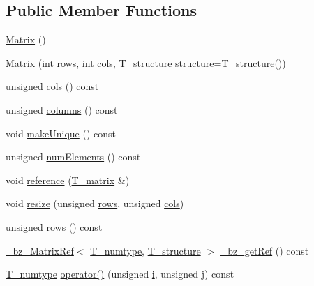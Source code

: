 \subsection*{Public Member Functions}
\begin{DoxyCompactItemize}
\item 
\hyperlink{classMatrix_af681cd26c7a0d3a102e309198be1c8c8}{Matrix} ()
\item 
\hyperlink{classMatrix_a6a7f5ed5100e108331ece885dc641dd5}{Matrix} (int \hyperlink{classMatrix_ac042ab4f91be304a8c7a6b9c3505157f}{rows}, int \hyperlink{classMatrix_a7a780e46272c5270b6e3d5dcb4c70e4b}{cols}, \hyperlink{classMatrix_a0441c5aed57ace2b56e48fc618b081bf}{T\+\_\+structure} structure=\hyperlink{classMatrix_a0441c5aed57ace2b56e48fc618b081bf}{T\+\_\+structure}())
\item 
unsigned \hyperlink{classMatrix_a7a780e46272c5270b6e3d5dcb4c70e4b}{cols} () const 
\item 
unsigned \hyperlink{classMatrix_a7943fa99256bcd90b17288e12466168f}{columns} () const 
\item 
void \hyperlink{classMatrix_ab4a3546ccce6320ac4a42e02d1edd180}{make\+Unique} () const 
\item 
unsigned \hyperlink{classMatrix_ad29299b659a1fd96ce011623e065a1a1}{num\+Elements} () const 
\item 
void \hyperlink{classMatrix_adafdeeb697e99efebd602a505685edec}{reference} (\hyperlink{classMatrix_ae07f7dfb83325c5854333ed7e85d2ebb}{T\+\_\+matrix} \&)
\item 
void \hyperlink{classMatrix_aca81b41a4f1e72d05e2e28a99f8bdb58}{resize} (unsigned \hyperlink{classMatrix_ac042ab4f91be304a8c7a6b9c3505157f}{rows}, unsigned \hyperlink{classMatrix_a7a780e46272c5270b6e3d5dcb4c70e4b}{cols})
\item 
unsigned \hyperlink{classMatrix_ac042ab4f91be304a8c7a6b9c3505157f}{rows} () const 
\item 
\hyperlink{class__bz__MatrixRef}{\+\_\+bz\+\_\+\+Matrix\+Ref}$<$ \hyperlink{classMatrix_aa2e0c7f09cbf31c078ad0b0977588e70}{T\+\_\+numtype}, \hyperlink{classMatrix_a0441c5aed57ace2b56e48fc618b081bf}{T\+\_\+structure} $>$ \hyperlink{classMatrix_aca6af21599b112514b60a251e26bfcb5}{\+\_\+bz\+\_\+get\+Ref} () const 
\item 
\hyperlink{classMatrix_aa2e0c7f09cbf31c078ad0b0977588e70}{T\+\_\+numtype} \hyperlink{classMatrix_a6a6d0a116a2f2a67f74826802c155080}{operator()} (unsigned \hyperlink{indexexpr_8h_aabd77643995707c185e95c8cb2782c81}{i}, unsigned \hyperlink{indexexpr_8h_aa1f3325d66516548e69238097857fa98}{j}) const 

\end{DoxyCompactItemize}

